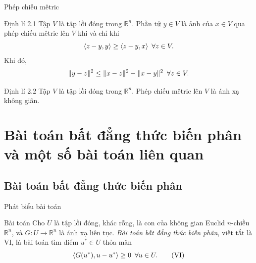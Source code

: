 \documentclass[aspectratio=169]{beamer}
\DeclarePairedDelimiter{\pro}{\langle}{\rangle}
\DeclarePairedDelimiter{\norm}{\lVert}{\rVert}
\theoremstyle{plain}
\theoremstyle{definition}
\theoremstyle{remark}
\begin{document}
\begin{frame}{Phép chiếu mêtric}
\begin{block}{Định lí 2.1}
    Tập $V$ là tập lồi đóng trong $\mathbb{R}^n$. Phần tử $y\in V$ là ảnh của $x\in V$ qua phép chiếu mêtric lên $V$ khi và chỉ khi
$$
\pro{z-y,y}\geq\pro{z-y,x}\enskip\forall z\in V.
$$
Khi đó,
$$
\norm{y-z}^2\leq\norm{x-z}^2-\norm{x-y}^2\enskip\forall z\in V.
$$
\end{block}
\begin{block}{Định lí 2.2}
    Tập $V$ là tập lồi đóng trong $\mathbb{R}^n$. Phép chiếu mêtric lên $V$ là ánh xạ không giãn.
\end{block}
\end{frame}
\section{Bài toán bất đẳng thức biến phân và một số bài toán liên quan}
\subsection{Bài toán bất đẳng thức biến phân}
\begin{frame}{Phát biểu bài toán}\pause
\begin{block}{Bài toán}
    Cho $U$ là tập lồi đóng, khác rỗng, là con của không gian Euclid $n$-chiều $\mathbb{R}^n$, và $G: U\to\mathbb{R}^n$ là ánh xạ liên tục. \textit{Bài toán bất đẳng thức biến phân}, viết tắt là VI, là bài toán tìm điểm $u^*\in U$ thỏa mãn 
\begin{equation}
    \pro{G(u^*),u-u^*}\geq 0\enskip \forall u\in U.
    \label{VI1}\tag{VI}
\end{equation}
\end{block}
\end{frame}
\end{document}
